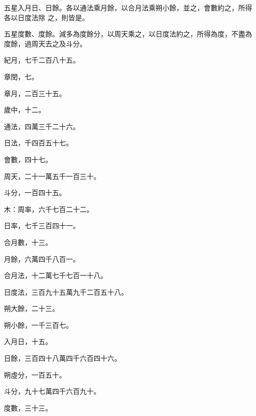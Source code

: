 \begin{pinyinscope}
 五星入月日、日餘。各以通法乘月餘，以合月法乘朔小餘，並之，會數約之，所得各以日度法除
 之，則皆是。



 五星度數、度餘。減多為度餘分，以周天乘之，以日度法約之，所得為度，不盡為度餘，過周天去之及斗分。



 紀月，七千二百八十五。



 章閏，七。



 章月，二百三十五。



 歲中，十二。



 通法，四萬三千二十六。



 日法，千四百五十七。



 會數，四十七。



 周天，二十一萬五千一百三十。



 斗分，一百四十五。



 木：周率，六千七百二十二。



 日率，七千三百四十一。



 合月數，十三。



 月餘，六萬四千八百一。



 合月法，十二萬七千七百一十八。



 日度法，三百九十五萬九千二百五十八。



 朔大餘，二十三。



 朔小餘，一千三百七。



 入月日，十五。



 日餘，三百四十八萬四千六百四十六。



 朔虛分，一百五十。



 斗分，九十七萬四千六百九十。



 度數，三十三。




\end{pinyinscope}
